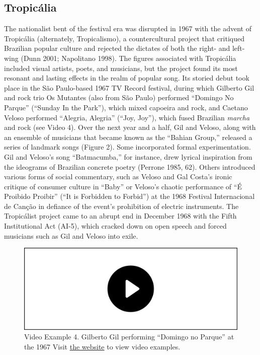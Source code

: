 \documentclass[twoside]{article}
\providecommand{\wmturlcaption}{
  Visit \href{https://worldmusictextbook.org/mcnally-2021}{the website} to view video examples.
}
\begin{document}
\hypertarget{tropicuxe1lia}{%
\subsection*{Tropicália}\label{tropicuxe1lia}}

The nationalist bent of the festival era was disrupted in 1967 with the
advent of Tropicália (alternately, Tropicalismo), a countercultural
project that critiqued Brazilian popular culture and rejected the
dictates of both the right- and left-wing (Dunn 2001; Napolitano 1998).
The figures associated with Tropicália included visual artists, poets,
and musicians, but the project found its most resonant and lasting
effects in the realm of popular song. Its storied debut took place in
the São Paulo-based 1967 TV Record festival, during which Gilberto Gil
and rock trio Os Mutantes (also from São Paulo) performed ``Domingo No
Parque'' (``Sunday In the Park''), which mixed capoeira and rock, and
Caetano Veloso performed ``Alegria, Alegria'' (``Joy, Joy''), which
fused Brazilian \emph{marcha} and rock (see Video 4). Over the next year
and a half, Gil and Veloso, along with an ensemble of musicians that
became known as the ``Bahian Group,'' released a series of landmark
songs (Figure 2). Some incorporated formal experimentation. Gil and
Veloso's song ``Batmacumba,'' for instance, drew lyrical inspiration
from the ideograms of Brazilian concrete poetry (Perrone 1985, 62).
Others introduced various forms of social commentary, such as Veloso and
Gal Costa's ironic critique of consumer culture in ``Baby'' or Veloso's
chaotic performance of ``É Proibido Proibir'' (``It is Forbidden to
Forbid'') at the 1968 Festival Internacional de Canção in defiance of
the event's prohibition of electric instruments. The Tropicálist project
came to an abrupt end in December 1968 with the Fifth Institutional Act
(AI-5), which cracked down on open speech and forced musicians such as
Gil and Veloso into exile.

\begin{figure}
  \includegraphics[width=\textwidth]{../play-video.png}
  \caption*{Video Example 4. Gilberto Gil performing ``Domingo no Parque'' at the 1967 \wmturlcaption}
\end{figure}
\end{document}
